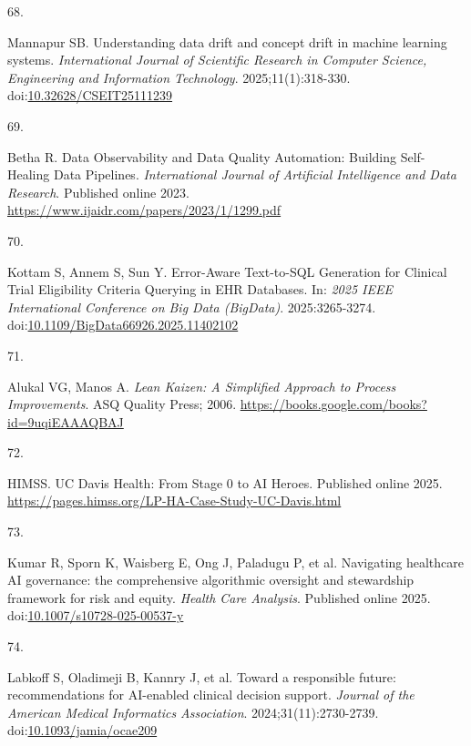 \documentclass[
  american,
  11pt,
  letterpaper,
  oneside  ,captions=tableheading
]{scrartcl}
\newlength{\cslhangindent}
\newlength{\csllabelwidth}
\newenvironment{CSLReferences}[2] %
 {\begin{list}{}{%
  \setlength{\itemindent}{0pt}
  \setlength{\leftmargin}{0pt}
  \setlength{\parsep}{0pt}
  \ifodd #1
   \setlength{\leftmargin}{\cslhangindent}
   \setlength{\itemindent}{-1\cslhangindent}
  \fi
  \setlength{\itemsep}{#2\baselineskip}}}
 {\end{list}}
\newcommand{\CSLLeftMargin}[1]{\parbox[t]{\csllabelwidth}{\strut#1\strut}}
\newcommand{\CSLRightInline}[1]{\parbox[t]{\linewidth - \csllabelwidth}{\strut#1\strut}}
\begin{document}
\begin{CSLReferences}{0}{1}
\CSLLeftMargin{68. }%
\CSLRightInline{Mannapur SB. Understanding data drift and concept drift
in machine learning systems. \emph{International Journal of Scientific
Research in Computer Science, Engineering and Information Technology}.
2025;11(1):318-330.
doi:\href{https://doi.org/10.32628/CSEIT25111239}{10.32628/CSEIT25111239}}

\CSLLeftMargin{69. }%
\CSLRightInline{Betha R. {Data Observability and Data Quality
Automation: Building Self-Healing Data Pipelines}. \emph{International
Journal of Artificial Intelligence and Data Research}. Published online
2023. \url{https://www.ijaidr.com/papers/2023/1/1299.pdf}}

\CSLLeftMargin{70. }%
\CSLRightInline{Kottam S, Annem S, Sun Y. {Error-Aware Text-to-SQL
Generation for Clinical Trial Eligibility Criteria Querying in EHR
Databases}. In: \emph{2025 IEEE International Conference on Big Data
(BigData)}. 2025:3265-3274.
doi:\href{https://doi.org/10.1109/BigData66926.2025.11402102}{10.1109/BigData66926.2025.11402102}}

\CSLLeftMargin{71. }%
\CSLRightInline{Alukal VG, Manos A. \emph{Lean Kaizen: A Simplified
Approach to Process Improvements}. ASQ Quality Press; 2006.
\url{https://books.google.com/books?id=9uqiEAAAQBAJ}}

\CSLLeftMargin{72. }%
\CSLRightInline{HIMSS. {UC Davis Health: From Stage 0 to AI Heroes}.
Published online 2025.
\url{https://pages.himss.org/LP-HA-Case-Study-UC-Davis.html}}

\CSLLeftMargin{73. }%
\CSLRightInline{{Kumar R, Sporn K, Waisberg E, Ong J, Paladugu P, et
al.} {Navigating healthcare AI governance: the comprehensive algorithmic
oversight and stewardship framework for risk and equity}. \emph{Health
Care Analysis}. Published online 2025.
doi:\href{https://doi.org/10.1007/s10728-025-00537-y}{10.1007/s10728-025-00537-y}}

\CSLLeftMargin{74. }%
\CSLRightInline{{Labkoff S, Oladimeji B, Kannry J, et al.} {Toward a
responsible future: recommendations for AI-enabled clinical decision
support}. \emph{Journal of the American Medical Informatics
Association}. 2024;31(11):2730-2739.
doi:\href{https://doi.org/10.1093/jamia/ocae209}{10.1093/jamia/ocae209}}


\end{CSLReferences}
\end{document}
